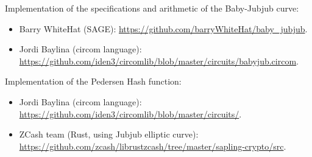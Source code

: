 	Implementation of the specifications and arithmetic of the Baby-Jubjub curve: 
		\begin{itemize}
			\item Barry WhiteHat (SAGE):
			\url{https://github.com/barryWhiteHat/baby_jubjub}.
			\item Jordi Baylina (circom language):
			\url{https://github.com/iden3/circomlib/blob/master/circuits/babyjub.circom}.
		\end{itemize}
	Implementation of the Pedersen Hash function: 
		\begin{itemize}
			\item Jordi Baylina (circom language):
			\url{https://github.com/iden3/circomlib/blob/master/circuits/}.
			\item ZCash team (Rust, using Jubjub elliptic curve):
			\url{https://github.com/zcash/librustzcash/tree/master/sapling-crypto/src}.		
		\end{itemize}

